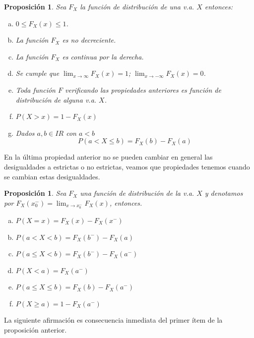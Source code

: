 \documentclass[12pt]{report}
\newtheorem{proposition}[definition]{Proposici\'on}
\def\R{I\!\!R}
\begin{document}
\begin{proposition}
       Sea $F_{X}$ la función de distribución  de una  v.a. $X$ entonces:
\begin{enumerate}[a)]
           \item  $0\leq F_{X}(x)\leq 1$.
           \item La función $F_{X}$ es no decreciente.
           \item La función $F_{X}$ es continua por la derecha.
           \item Se cumple que $\displaystyle\lim_{x\to\infty}F_{X}(x)=1$;
           $\lim_{x\to-\infty}F_{X}(x)=0$.
           \item  Toda función $F$ verificando las propiedades anteriores es función de
           distribución de alguna v.a. $X$.
           \item $P(X>x)=1-F_{X}(x)$
           \item Dados $a,b\in\R$ con $a<b$ $$P(a<X\leq b)=F_{X}(b)-F_{X}(a)$$
\end{enumerate}
\end{proposition}

En la última propiedad anterior no se pueden cambiar en general las desigualdades a
estrictas o no estrictas, veamos que propiedades tenemos cuando se cambian estas
desigualdades.

\begin{proposition}
           Sea $F_{X}$ una función de distribución de la v.a. $X$ y denotamos
           por $F_{X}(x_{0}^{-})=\lim_{x\to x_{0}^{-}} F_{X}(x)$, entonces.
           \begin{enumerate}[a)]
           \item  $P(X=x)=F_{X}(x)-F_{X}(x^{-})$
           \item $P(a< X< b)=F_{X}(b^{-})-F_{X}(a)$
           \item $P(a\leq X< b)=F_{X}(b^{-})-F_{X}(a^{-})$
           \item $P(X<a)=F_{X}(a^{-})$
           \item $P(a\leq X\leq b)=F_{X}(b)-F_{X}(a^{-})$
           \item $P(X\geq a)=1-F_{X}(a^{-})$
        \end{enumerate}
\end{proposition}

La siguiente afirmación es consecuencia inmediata del primer ítem de la proposición
anterior.
\end{document}
